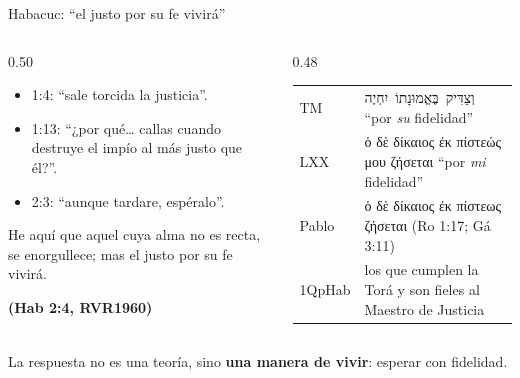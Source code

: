 \documentclass[hyperref={bookmarks=false},aspectratio=169]{beamer}
\newcommand{\heb}[1]{\mbox{\foreignlanguage{hebrew}{#1}}}
\newcommand{\grc}[1]{\foreignlanguage{ancientgreek}{#1}}
\newcommand{\fuente}[1]{\par\hfill{\upshape\bfseries\footnotesize\textcolor{azul}{#1}}}
\newcommand{\destacar}[1]{\textbf{\textcolor{azul}{#1}}}
\begin{document}
\begin{frame}{Habacuc: ``el justo por su fe vivirá''}
\begin{columns}[c,onlytextwidth]
\begin{column}{0.50\textwidth}\small
\begin{itemize}
\item 1:4: ``sale torcida la justicia''.
\item 1:13: ``¿por qué\ldots{} callas cuando destruye el impío al más justo que él?''.
\item 2:3: ``aunque tardare, espéralo''.
\end{itemize}
\begin{cita}He aquí que aquel cuya alma no es recta, se enorgullece; mas el justo por su fe vivirá.\fuente{(Hab 2:4, RVR1960)}\end{cita}
\end{column}
\begin{column}{0.48\textwidth}
\scriptsize\renewcommand{\arraystretch}{1.15}
\begin{tabular}{@{}>{\RaggedRight\arraybackslash}p{1.1cm}>{\RaggedRight\arraybackslash}p{4.1cm}@{}}
\toprule
TM & \heb{וְצַדִּיק בֶּאֱמוּנָתוֹ יִחְיֶה} ``por \emph{su} fidelidad'' \\
LXX & \grc{ὁ δὲ δίκαιος ἐκ πίστεώς μου ζήσεται} ``por \emph{mi} fidelidad'' \\
Pablo & \grc{ὁ δὲ δίκαιος ἐκ πίστεως ζήσεται} (Ro 1:17; Gá 3:11) \\
1QpHab & los que cumplen la Torá y son fieles al Maestro de Justicia \\
\bottomrule
\end{tabular}
\end{column}
\end{columns}\par\smallskip
\small La respuesta no es una teoría, sino \destacar{una manera de vivir}: esperar con fidelidad.
\end{frame}
\end{document}

